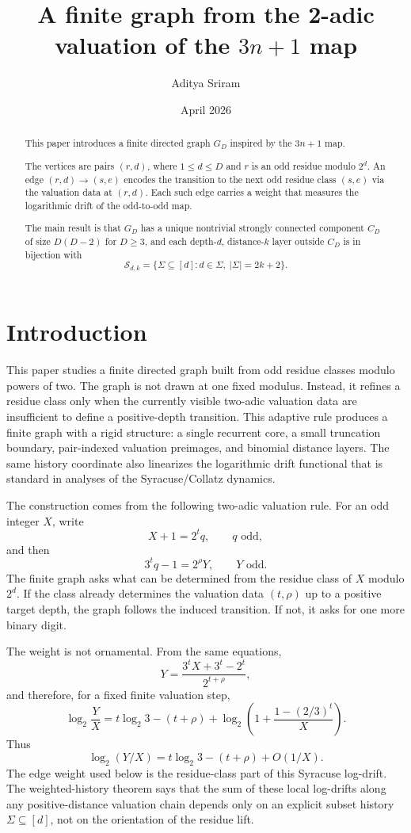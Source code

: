 \documentclass[11pt]{amsart}
\title{A finite graph from the 2-adic valuation of the \texorpdfstring{$3n+1$}{3n+1} map}
\author{Aditya Sriram}
\date{April 2026}
\theoremstyle{definition}
\theoremstyle{remark}
\newcommand{\Sfam}{\mathcal S}
\begin{document}
\maketitle

\begin{abstract}
\setlength{\parskip}{0.6em} 
\setlength{\parindent}{0pt} 

This paper introduces a finite directed graph $G_D$ inspired by the $3n+1$ map.

The vertices are pairs $(r,d)$, where $1\le d\le D$ and $r$ is an odd 
residue modulo $2^d$. An edge $(r,d) \longrightarrow (s,e)$ encodes the
transition to the next odd residue class $(s,e)$ via the valuation data 
at $(r,d)$. Each such edge carries a weight that measures the logarithmic 
drift of the odd-to-odd map.

The main result is that $G_D$ has a unique nontrivial strongly connected
component $C_D$ of size $D(D-2)$ for $D\ge 3$, and each depth-$d$,
distance-$k$ layer outside $C_D$ is in bijection with 
\[
\Sfam_{d,k} = \{\Sigma\subseteq[d] : d\in\Sigma,\ |\Sigma|=2k+2\}.
\]
\end{abstract}


\section{Introduction}

This paper studies a finite directed graph built from odd residue classes modulo powers of two.  The graph is not drawn at one fixed modulus.  Instead, it refines a residue class only when the currently visible two-adic valuation data are insufficient to define a positive-depth transition.  This adaptive rule produces a finite graph with a rigid structure: a single recurrent core, a small truncation boundary, pair-indexed valuation preimages, and binomial distance layers.  The same history coordinate also linearizes the logarithmic drift functional that is standard in analyses of the Syracuse/Collatz dynamics.

The construction comes from the following two-adic valuation rule.  For an odd integer $X$, write
\[
X+1=2^tq,\qquad q\text{ odd},
\]
and then
\[
3^tq-1=2^\rho Y,\qquad Y\text{ odd}.
\]
The finite graph asks what can be determined from the residue class of $X$ modulo $2^d$.  If the class already determines the valuation data $(t,\rho)$ up to a positive target depth, the graph follows the induced transition.  If not, it asks for one more binary digit.

The weight is not ornamental.  From the same equations,
\[
Y=\frac{3^tX+3^t-2^t}{2^{t+\rho}},
\]
and therefore, for a fixed finite valuation step,
\[
\log_2\frac{Y}{X}
=
t\log_2 3-(t+\rho)
+
\log_2\!\left(1+\frac{1-(2/3)^t}{X}\right).
\]
Thus
\[
\log_2(Y/X)=t\log_2 3-(t+\rho)+O(1/X).
\]
The edge weight used below is the residue-class part of this Syracuse log-drift.  The weighted-history theorem says that the sum of these local log-drifts along any positive-distance valuation chain depends only on an explicit subset history $\Sigma\subseteq[d]$, not on the orientation of the residue lift.
\end{document}
